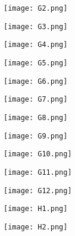 \documentclass{article}
\begin{document}
\begin{figure}[!hb]
\centering
\texttt{[image:  G2.png]}
\end{figure}

\begin{figure}[!hb]
\centering
\texttt{[image:  G3.png]}
\end{figure}

\begin{figure}[!hb]
\centering
\texttt{[image:  G4.png]}
\end{figure}

\begin{figure}[!hb]
\centering
\texttt{[image:  G5.png]}
\end{figure}

\begin{figure}[!hb]
\centering
\texttt{[image:  G6.png]}
\end{figure}

\begin{figure}[!hb]
\centering
\texttt{[image:  G7.png]}
\end{figure}

\begin{figure}[!hb]
\centering
\texttt{[image:  G8.png]}
\end{figure}

\begin{figure}[!hb]
\centering
\texttt{[image:  G9.png]}
\end{figure}

\begin{figure}[!hb]
\centering
\texttt{[image:  G10.png]}
\end{figure}

\begin{figure}[!hb]
\centering
\texttt{[image:  G11.png]}
\end{figure}

\begin{figure}[!hb]
\centering
\texttt{[image:  G12.png]}
\end{figure}

\begin{figure}[!hb]
\centering
\texttt{[image:  H1.png]}
\end{figure}

\begin{figure}[!hb]
\centering
\texttt{[image:  H2.png]}
\end{figure}
\end{document}
